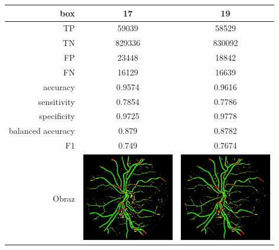 \documentclass[polish,polish,a4paper]{article}
\begin{document}
\begin{tabular}{|r|c|c|}
\hline
box               & 17                                            & 19                                            \\ \hline \hline
TP                & 59039                                         & 58529                                         \\ \hline
TN                & 829336                                        & 830092                                        \\ \hline
FP                & 23448                                         & 18842                                         \\ \hline
FN                & 16129                                         & 16639                                         \\ \hline
accuracy          & 0.9574                                        & 0.9616                                        \\ \hline
sensitivity       & 0.7854                                        & 0.7786                                        \\ \hline
specificity       & 0.9725                                        & 0.9778                                        \\ \hline
balanced accuracy & 0.879                                         & 0.8782                                        \\ \hline
F1                & 0.749                                         & 0.7674                                        \\ \hline
Obraz             & \includegraphics[width=4cm]{./dane/box17.jpg} & \includegraphics[width=4cm]{./dane/box19.jpg} \\ \hline
\end{tabular}		
		
\end{document}
